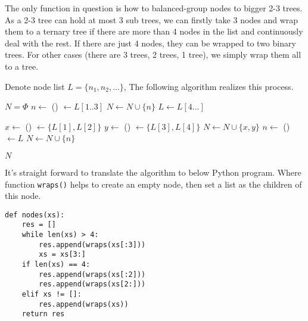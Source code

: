 \documentclass[UTF8]{article}
\begin{document}
The only function in question is how to balanced-group nodes to bigger 2-3 trees. As a 2-3 tree
can hold at most 3 sub trees, we can firstly take 3 nodes and wrap them to a ternary tree if there
are more than 4 nodes in the list and continuously deal with the rest.
If there are just 4 nodes, they can be wrapped to two
binary trees. For other cases (there are 3 trees, 2 trees, 1 tree), we simply wrap them
all to a tree.

Denote node list $L=\{ n_1, n_2, ... \}$, The following algorithm realizes this process.

\begin{algorithmic}
  \State $N = \Phi$
    \State $n \gets$ ()
    \State {} $\gets L[1..3]$  
    \State $N \gets N \cup \{ n \}$
    \State $L \gets L[4...]$ 
  \EndWhile

    \State $x \gets$ ()
    \State {} $\gets \{L[1], L[2]\}$
    \State $y \gets$ ()
    \State {} $\gets \{L[3], L[4]\}$
    \State $N \gets N \cup \{ x, y \}$
    \State $n \gets$ ()
    \State {} $\gets L$
    \State $N \gets N \cup \{ n \}$
  \EndIf

  \State \Return $N$
\EndFunction
\end{algorithmic}

It's straight forward to translate the algorithm to below Python program. Where function \verb|wraps()|
helps to create an empty node, then set a list as the children of this node.

\begin{lstlisting}
def nodes(xs):
    res = []
    while len(xs) > 4:
        res.append(wraps(xs[:3]))
        xs = xs[3:]
    if len(xs) == 4:
        res.append(wraps(xs[:2]))
        res.append(wraps(xs[2:]))
    elif xs != []:
        res.append(wraps(xs))
    return res
\end{lstlisting}
\end{document}
